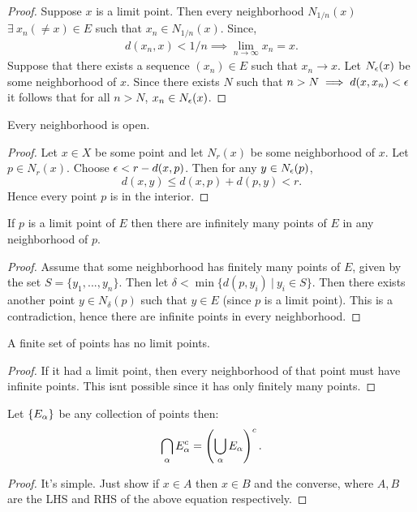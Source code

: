\begin{proof}
  Suppose $x$ is a limit point. Then every neighborhood $N_{1/n}(x)$ $\exists\ x_n (\neq x) \in E$ such that $x_n \in N_{1/n}(x)$. Since,
  \begin{align*}
    d(x_n, x) < 1/n \implies \lim_{n\to \infty} x_n = x.
  \end{align*}
  Suppose that there exists a sequence $(x_n) \in E$ such that $x_n \to x$. Let $N_\epsilon(x)$ be some neighborhood of $x$. Since there exists $N$ such that $n>N \implies d(x,x_n)<\epsilon$ it follows that for all $n>N$, $x_n \in N_\epsilon(x)$.
\end{proof}
\begin{proposition}
  Every neighborhood is open.
\end{proposition}
\begin{proof}
  Let $x\in X$ be some point and let $N_r(x)$ be some neighborhood of $x$. Let $p\in N_r(x)$. Choose $\epsilon < r- d(x,p)$. Then for any $y\in N_\epsilon(p)$, 
  \[d(x,y) \leq d(x,p) + d(p,y) < r.\]
  Hence every point $p$ is in the interior.
\end{proof}
\begin{proposition}
  If $p$ is a limit point of $E$ then there are infinitely many points of $E$ in any neighborhood of $p$.
\end{proposition}
\begin{proof}
  Assume that some neighborhood has finitely many points of $E$, given by the set $S= \{y_1,...,y_n\}$. Then let $\delta < \min\{d(p,y_i)\ |\ y_i \in S\}$. Then there exists another point $y\in N_\delta (p)$ such that $y\in E$ (since $p$ is a limit point). This is a contradiction, hence there are infinite points in every neighborhood.
\end{proof}
\begin{corollary}
  A finite set of points has no limit points.
\end{corollary}
\begin{proof}
  If it had a limit point, then every neighborhood of that point must have infinite points. This isnt possible since it has only finitely many points.
\end{proof}
\begin{proposition}
  Let $\{E_\alpha\}$ be any collection of points then:
  \[\bigcap_\alpha E_\alpha^c = \left(\bigcup_\alpha E_\alpha\right)^c.\]
\end{proposition}
\begin{proof}
  It's simple. Just show if $x\in A$ then $x\in B$ and the converse, where $A,B$ are the LHS and RHS of the above equation respectively. 
\end{proof}
